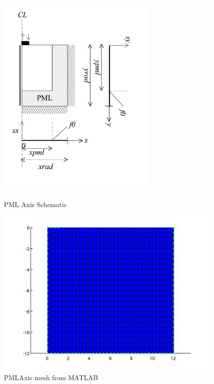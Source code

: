 \begin{figure}[htbp]
  \centering
  \includegraphics[trim = 0in 2in 0in 0in, clip, height=4in]{fig/2daxispml.pdf}
  \caption{PML Axis Schematic}
  \label{fig:PMLAxisSchematic}
  \begin{minipage}{0.45\linewidth}
    \includegraphics[width=\linewidth]{fig/pmlaxis_mesh_matlab.jpg}
    \caption{PMLAxis mesh from MATLAB}
    \label{fig:PMLAxisMeshMATLAB}
  \end{minipage}
  \hfill
  \begin{minipage}{0.45\linewidth}

\end{minipage}
\end{figure}
